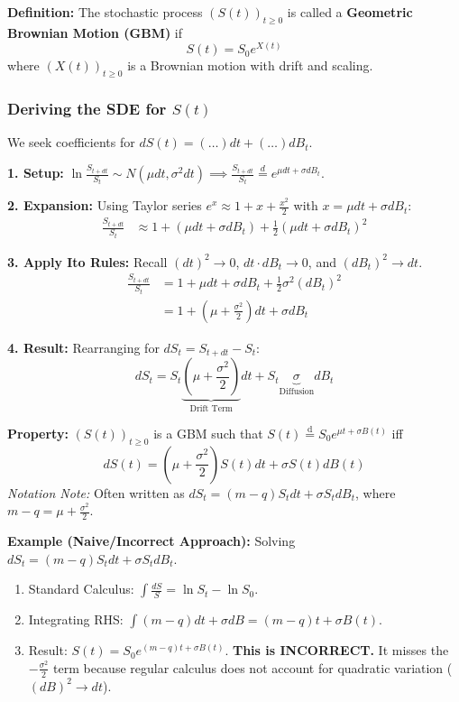 \begin{framed}
\textbf{Definition: } The stochastic process \((S(t))_{t \ge 0}\) is called a \textbf{Geometric Brownian Motion (GBM)} if
\begin{equation*}
    S(t) = S_0e^{X(t)}
\end{equation*}
where \((X(t))_{t \ge 0}\) is a Brownian motion with drift and scaling.
\end{framed}

\subsubsection*{Deriving the SDE for $S(t)$}
We seek coefficients for \(dS(t) = (\dots) dt + (\dots) dB_t\).

\textbf{1. Setup:} $\ln \frac{S_{t+dt}}{S_t} \sim N(\mu dt, \sigma^2 dt) \implies \frac{S_{t+dt}}{S_t} \stackrel{d}{=} e^{\mu dt + \sigma dB_t}$.

\textbf{2. Expansion:} Using Taylor series $e^x \approx 1 + x + \frac{x^2}{2}$ with $x = \mu dt + \sigma dB_t$:
\begin{align*}
\frac{S_{t+dt}}{S_t} &\approx 1 + (\mu dt + \sigma dB_t) + \frac{1}{2}(\mu dt + \sigma dB_t)^2
\end{align*}

\textbf{3. Apply Ito Rules:} Recall $(dt)^2 \to 0$, $dt \cdot dB_t \to 0$, and $(dB_t)^2 \to dt$.
\begin{align*}
\frac{S_{t+dt}}{S_t} &= 1 + \mu dt + \sigma dB_t + \frac{1}{2}\sigma^2 (dB_t)^2 \\
&= 1 + \left(\mu + \frac{\sigma^2}{2}\right)dt + \sigma dB_t
\end{align*}

\textbf{4. Result:} Rearranging for $dS_t = S_{t+dt} - S_t$:
\[
\boxed{dS_t = S_t \underbrace{\left(\mu + \frac{\sigma^2}{2}\right)}_{\text{Drift Term}} dt + S_t \underbrace{\sigma}_{\text{Diffusion}} dB_t}
\]

\textbf{Property: } \((S(t))_{t \ge 0}\) is a GBM such that \(S(t) \stackrel{\text{d}}{=} S_0e^{\mu t + \sigma B(t)}\) iff
\begin{equation*}
    dS(t) = \left( \mu + \frac{\sigma^2}{2}\right) S(t) dt + \sigma S(t)dB(t)
\end{equation*}
\textit{Notation Note:} Often written as $dS_t = (m-q)S_t dt + \sigma S_t dB_t$, where $m-q = \mu + \frac{\sigma^2}{2}$.

\textbf{Example (Naive/Incorrect Approach):} Solving $dS_t = (m-q)S_t dt + \sigma S_t dB_t$.
\begin{enumerate}
    \item Standard Calculus: $\int \frac{dS}{S} = \ln S_t - \ln S_0$.
    \item Integrating RHS: $\int (m-q)dt + \sigma dB = (m-q)t + \sigma B(t)$.
    \item Result: $S(t) = S_0 e^{(m-q)t + \sigma B(t)}$. \textbf{This is INCORRECT.} It misses the $-\frac{\sigma^2}{2}$ term because regular calculus does not account for quadratic variation ($(dB)^2 \to dt$).
\end{enumerate}

